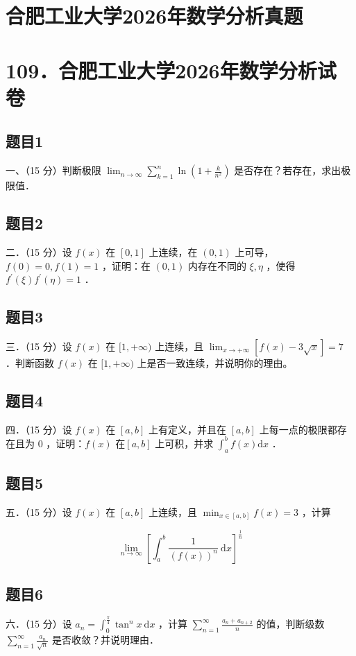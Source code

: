 \documentclass{article}
\begin{document}
\section*{合肥工业大学2026年数学分析真题}
\section*{109．合肥工业大学2026年数学分析试卷}

\subsection{题目1}
一、（15 分）判断极限 \(\lim _{n \rightarrow \infty} \sum_{k=1}^{n} \ln \left(1+\frac{k}{n^{2}}\right)\) 是否存在？若存在，求出极限值．

\subsection{题目2}
二．（15 分）设 \(f(x)\) 在 \([0,1]\) 上连续，在 \((0,1)\) 上可导，\(f(0)=0, f(1)=1\) ，证明：在 \((0,1)\) 内存在不同的 \(\xi, \eta\) ，使得 \(f^{\prime}(\xi) f^{\prime}(\eta)=1\) ．

\subsection{题目3}
三．（15 分）设 \(f(x)\) 在 \([1,+\infty)\) 上连续，且 \(\lim _{x \rightarrow+\infty}[f(x)-3 \sqrt{x}]=7\) ．判断函数 \(f(x)\) 在 \([1,+\infty)\) 上是否一致连续，并说明你的理由。

\subsection{题目4}
四．（15 分）设 \(f(x)\) 在 \([a, b]\) 上有定义，并且在 \([a, b]\) 上每一点的极限都存在且为 0 ，证明：\(f(x)\) 在\([a, b]\) 上可积，并求 \(\int_{a}^{b} f(x) \mathrm{d} x\) ．

\subsection{题目5}
五．（15 分）设 \(f(x)\) 在 \([a, b]\) 上连续，且 \(\min _{x \in[a, b]} f(x)=3\) ，计算

\[
\lim _{n \rightarrow \infty}\left[\int_{a}^{b} \frac{1}{(f(x))^{n}} \mathrm{~d} x\right]^{\frac{1}{n}}
\]

\subsection{题目6}
六．（15 分）设 \(a_{n}=\int_{0}^{\frac{\pi}{4}} \tan ^{n} x \mathrm{~d} x\) ，计算 \(\sum_{n=1}^{\infty} \frac{a_{n}+a_{n+2}}{n}\) 的值，判断级数 \(\sum_{n=1}^{\infty} \frac{a_{n}}{\sqrt{n}}\) 是否收敛？并说明理由．
\end{document}
